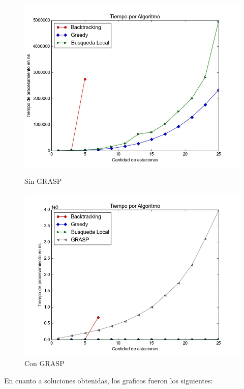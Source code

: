         \begin{figure}[H]
          \includegraphics[width=\linewidth]{imagenes/exp1b_ej5_tiempo_con_BT.jpeg}
          \caption{Sin GRASP}
        \endminipage\hfill
          \includegraphics[width=\linewidth]{imagenes/exp1b_ej5_tiempo_con_BT_con_MT.jpeg}
          \caption{Con GRASP}
        \endminipage
        \end{figure}

        En cuanto a soluciones obtenidas, los graficos fueron los siguientes:

